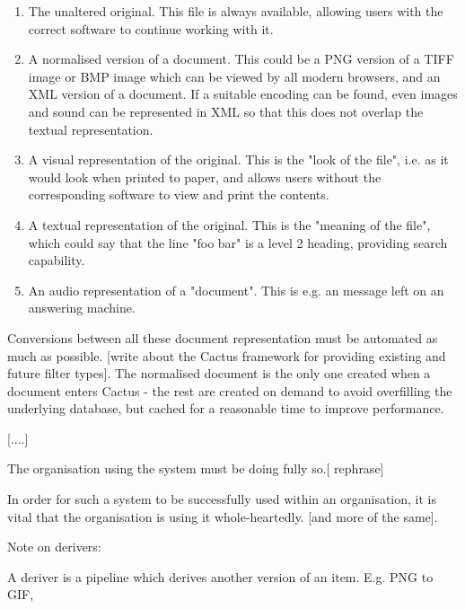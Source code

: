 \begin{enumerate}
\item The unaltered original.  This file is always available, allowing
  users with the correct software to continue working with it.

\item A normalised version of a document.  This could be a PNG version
  of a TIFF image or BMP image which can be viewed by all modern
  browsers, and an XML version of a document.  If a suitable encoding
  can be found, even images and sound can be represented in XML so
  that this does not overlap the textual representation.

\item A visual representation of the original.  This is the "look of
  the file", i.e. as it would look when printed to paper, and allows
  users without the corresponding software to view and print the
  contents.

\item A textual representation of the original.  This is the "meaning
  of the file", which could say that the line "foo bar" is a level 2
  heading, providing search capability.

  
\item An audio representation of a "document".  This is e.g. an
  message left on an answering machine.
\end{enumerate}

Conversions between all these document representation must be
automated as much as possible.  [write about the Cactus framework for
providing existing and future filter types].  The normalised document
is the only one created when a document enters Cactus - the rest are
created on demand to avoid overfilling the underlying database, but
cached for a reasonable time to improve performance.

[....]


The organisation using the system must be doing fully so.[ rephrase]

In order for such a system to be successfully used within an
organisation, it is vital that the organisation is using it
whole-heartedly.  [and more of the same].


Note on derivers:

A deriver is a pipeline which derives another version of an item.
E.g. PNG to GIF,

